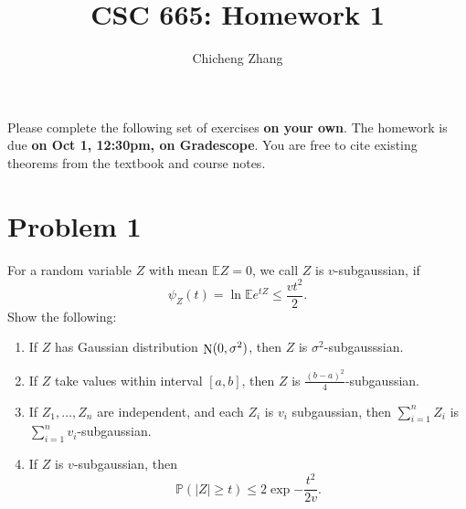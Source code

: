 \documentclass{article}
\title{CSC 665: Homework 1}
\author{Chicheng Zhang}
\DeclareMathOperator*{\N}{{\rm N}}
\newcommand{\EE}{\mathbb{E}} %
\newcommand{\PP}{\mathbb{P}} %
\begin{document}
\maketitle

Please complete the following set of exercises \textbf{on your own}.
The homework is due \textbf{on Oct 1, 12:30pm, on Gradescope}. You are free to
cite existing theorems from the textbook and course notes.

\section*{Problem 1}
For a random variable $Z$ with mean $\EE Z = 0$, we call $Z$ is $v$-subgaussian, if
\[ \psi_Z(t) = \ln \EE e^{t Z} \leq \frac{v t^2}{2}. \]
Show the following:
\begin{enumerate}
\item If $Z$ has Gaussian distribution $\N(0,\sigma^2)$, then $Z$ is
$\sigma^2$-subgausssian.
\item If $Z$ take values within interval $[a,b]$, then $Z$ is
$\frac{(b-a)^2}{4}$-subgaussian.
\item If $Z_1,\ldots,Z_n$ are independent, and each $Z_i$ is $v_i$ subgaussian, then
$\sum_{i=1}^n Z_i$ is $\sum_{i=1}^n v_i$-subgaussian.
\item If $Z$ is $v$-subgaussian, then
\[ \PP(|Z| \geq t) \leq 2 \exp{-\frac{t^2}{2v}}. \]
\end{enumerate}
\end{document}
